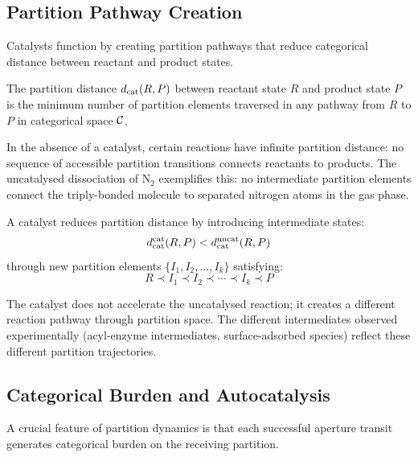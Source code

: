 \subsection{Partition Pathway Creation}

Catalysts function by creating partition pathways that reduce categorical distance between reactant and product states.

\begin{definition}
\label{def:partition_dist}
The partition distance $d_{\mathrm{cat}}(R, P)$ between reactant state $R$ and product state $P$ is the minimum number of partition elements traversed in any pathway from $R$ to $P$ in categorical space $\mathcal{C}$.
\end{definition}

In the absence of a catalyst, certain reactions have infinite partition distance: no sequence of accessible partition transitions connects reactants to products. The uncatalysed dissociation of N$_2$ exemplifies this: no intermediate partition elements connect the triply-bonded molecule to separated nitrogen atoms in the gas phase.

\begin{theorem}
\label{thm:pathway_creation}
A catalyst reduces partition distance by introducing intermediate states:
\begin{equation}
d_{\mathrm{cat}}^{\mathrm{cat}}(R, P) < d_{\mathrm{cat}}^{\mathrm{uncat}}(R, P)
\end{equation}
through new partition elements $\{I_1, I_2, \ldots, I_k\}$ satisfying:
\begin{equation}
R \prec I_1 \prec I_2 \prec \cdots \prec I_k \prec P
\end{equation}
\end{theorem}

The catalyst does not accelerate the uncatalysed reaction; it creates a different reaction pathway through partition space. The different intermediates observed experimentally (acyl-enzyme intermediates, surface-adsorbed species) reflect these different partition trajectories.

\subsection{Categorical Burden and Autocatalysis}

A crucial feature of partition dynamics is that each successful aperture transit generates categorical burden on the receiving partition.

